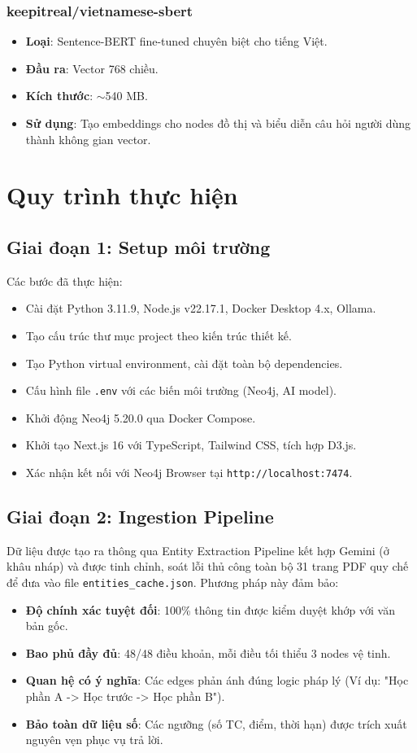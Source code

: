 \documentclass[12pt,a4paper]{article}
\begin{document}
\subsubsection{keepitreal/vietnamese-sbert}
\begin{itemize}
\item \textbf{Loại}: Sentence-BERT fine-tuned chuyên biệt cho tiếng Việt.
\item \textbf{Đầu ra}: Vector 768 chiều.
\item \textbf{Kích thước}: $\sim$540 MB.
\item \textbf{Sử dụng}: Tạo embeddings cho nodes đồ thị và biểu diễn câu hỏi người dùng thành không gian vector.
\end{itemize}

\section{Quy trình thực hiện}
\subsection{Giai đoạn 1: Setup môi trường}
Các bước đã thực hiện:
\begin{itemize}
\item Cài đặt Python 3.11.9, Node.js v22.17.1, Docker Desktop 4.x, Ollama.
\item Tạo cấu trúc thư mục project theo kiến trúc thiết kế.
\item Tạo Python virtual environment, cài đặt toàn bộ dependencies.
\item Cấu hình file \texttt{.env} với các biến môi trường (Neo4j, AI model).
\item Khởi động Neo4j 5.20.0 qua Docker Compose.
\item Khởi tạo Next.js 16 với TypeScript, Tailwind CSS, tích hợp D3.js.
\item Xác nhận kết nối với Neo4j Browser tại \texttt{http://localhost:7474}.
\end{itemize}

\subsection{Giai đoạn 2: Ingestion Pipeline}
Dữ liệu được tạo ra thông qua Entity Extraction Pipeline kết hợp Gemini (ở khâu nháp) và được tinh chỉnh, soát lỗi thủ công toàn bộ 31 trang PDF quy chế để đưa vào file \texttt{entities\_cache.json}. Phương pháp này đảm bảo:
\begin{itemize}
\item \textbf{Độ chính xác tuyệt đối}: 100\% thông tin được kiểm duyệt khớp với văn bản gốc.
\item \textbf{Bao phủ đầy đủ}: 48/48 điều khoản, mỗi điều tối thiểu 3 nodes vệ tinh.
\item \textbf{Quan hệ có ý nghĩa}: Các edges phản ánh đúng logic pháp lý (Ví dụ: "Học phần A -> Học trước -> Học phần B").
\item \textbf{Bảo toàn dữ liệu số}: Các ngưỡng (số TC, điểm, thời hạn) được trích xuất nguyên vẹn phục vụ trả lời.
\end{itemize}
\end{document}
